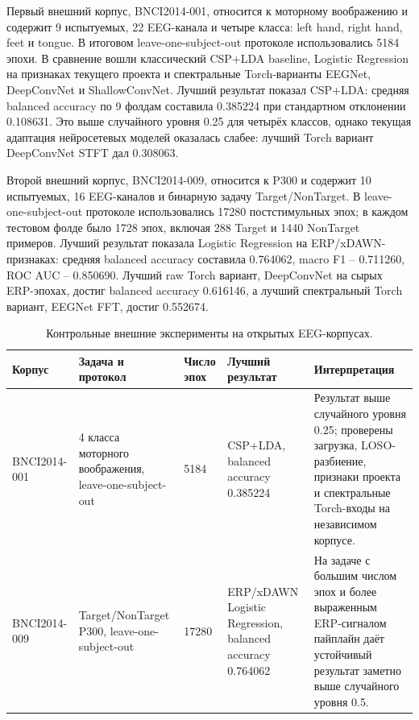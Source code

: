 Первый внешний корпус, BNCI2014-001, относится к моторному воображению и
содержит 9 испытуемых, 22 EEG-канала и четыре класса: left hand, right hand,
feet и tongue. В итоговом leave-one-subject-out протоколе использовались
5184 эпохи. В сравнение вошли классический CSP+LDA baseline, Logistic
Regression на признаках текущего проекта и спектральные Torch-варианты
EEGNet, DeepConvNet и ShallowConvNet. Лучший результат показал CSP+LDA:
средняя balanced accuracy по 9 фолдам составила 0.385224 при стандартном
отклонении 0.108631. Это выше случайного уровня 0.25 для четырёх классов,
однако текущая адаптация нейросетевых моделей оказалась слабее: лучший Torch
вариант DeepConvNet STFT дал 0.308063.

Второй внешний корпус, BNCI2014-009, относится к P300 и содержит 10
испытуемых, 16 EEG-каналов и бинарную задачу Target/NonTarget. В
leave-one-subject-out протоколе использовались 17280 постстимульных эпох; в
каждом тестовом фолде было 1728 эпох, включая 288 Target и 1440 NonTarget
примеров. Лучший результат показала Logistic Regression на ERP/xDAWN-признаках:
средняя balanced accuracy составила 0.764062, macro F1 -- 0.711260, ROC AUC --
0.850690. Лучший raw Torch вариант, DeepConvNet на сырых ERP-эпохах, достиг
balanced accuracy 0.616146, а лучший спектральный Torch вариант, EEGNet FFT,
достиг 0.552674.

\begin{table}[!t]
  \centering
  \small
  \setlength{\tabcolsep}{3pt}
  \renewcommand{\arraystretch}{1.15}
  \caption{Контрольные внешние эксперименты на открытых EEG-корпусах.}
  \label{tab:external-benchmark-results}
  \begin{tabularx}{\textwidth}{|L{29mm}|L{34mm}|L{16mm}|L{32mm}|Y|}
    \hline
    Корпус & Задача и протокол & Число эпох & Лучший результат & Интерпретация \\
    \hline
    BNCI2014-001 &
    4 класса моторного воображения, leave-one-subject-out &
    5184 &
    CSP+LDA, balanced accuracy 0.385224 &
    Результат выше случайного уровня 0.25; проверены загрузка, LOSO-разбиение,
    признаки проекта и спектральные Torch-входы на независимом корпусе. \\
    \hline
    BNCI2014-009 &
    Target/NonTarget P300, leave-one-subject-out &
    17280 &
    ERP/xDAWN Logistic Regression, balanced accuracy 0.764062 &
    На задаче с большим числом эпох и более выраженным ERP-сигналом пайплайн
    даёт устойчивый результат заметно выше случайного уровня 0.5. \\
    \hline
  \end{tabularx}
\end{table}

